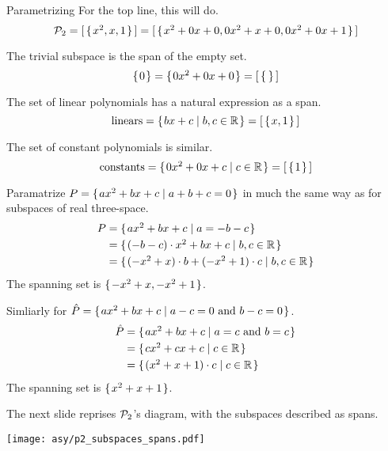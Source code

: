 \documentclass[10pt,t]{beamer}
\begin{document}
\begin{frame}{Parametrizing}
\ex
For the top line, this will do.
\begin{equation*}
  \mathcal{P}_2
  =\relax [\,\mbox{$\{\hspace{0.1em}x^2,x,1\hspace{0.1em}\}$}\,\relax ]
  =\relax [\,\mbox{$\{\hspace{0.1em}x^2+0x+0,
               0x^2+x+0,
               0x^2+0x+1\hspace{0.1em}\}$}\,\relax ]       
\end{equation*}

\ex
The trivial subspace is the span of the empty set.
\begin{equation*}
  \set{0}
  =\set{0x^2+0x+0}
  =\spanof{\,\set{}\,}
\end{equation*}

\pause
\ex
The set of linear polynomials has a natural expression as a span.
\begin{equation*}
  \text{linears}
  =\mbox{$\{\hspace{0.1em}bx+c\mid b,c\in\mathbb{R}\hspace{0.1em}\}$}
  =\relax [\,\mbox{$\{\hspace{0.1em}x,1\hspace{0.1em}\}$}\,\relax ]
\end{equation*}

\ex
The set of constant polynomials is similar.
\begin{equation*}
  \text{constants}
  =\mbox{$\{\hspace{0.1em}0x^2+0x+c\mid c\in\mathbb{R}\hspace{0.1em}\}$}
  =\relax [\,\mbox{$\{\hspace{0.1em}1\hspace{0.1em}\}$}\,\relax ]
\end{equation*}
\end{frame}


\begin{frame}
\ex
Paramatrize $P=\mbox{$\{\hspace{0.1em}ax^2+bx+c\mid a+b+c=0\hspace{0.1em}\}$}$ 
in much the same way as for subspaces of real three-space.
\begin{align*}
  P
  &=\mbox{$\{\hspace{0.1em}ax^2+bx+c\mid a=-b-c\hspace{0.1em}\}$}     \\
  &=\mbox{$\{\hspace{0.1em}(-b-c)\cdot x^2+bx+c\mid b,c\in\mathbb{R}\hspace{0.1em}\}$}  \\     
  &=\mbox{$\{\hspace{0.1em}(-x^2+x)\cdot b+(-x^2+1)\cdot c\mid b,c\in\mathbb{R}\hspace{0.1em}\}$}       
\end{align*}
The spanning set is $\mbox{$\{\hspace{0.1em}-x^2+x, -x^2+1\hspace{0.1em}\}$}$.

\pause
\ex
Simliarly for 
$\hat{P}=\mbox{$\{\hspace{0.1em}ax^2+bx+c\mid \text{$a-c=0$ and $b-c=0$}\hspace{0.1em}\}$}$.
\begin{align*}
  \hat{P}
  &=\mbox{$\{\hspace{0.1em}ax^2+bx+c\mid \text{$a=c$ and $b=c$}\hspace{0.1em}\}$}     \\
  &=\mbox{$\{\hspace{0.1em}cx^2+cx+c\mid c\in\mathbb{R}\hspace{0.1em}\}$}     \\
  &=\mbox{$\{\hspace{0.1em}(x^2+x+1)\cdot c \mid c\in\mathbb{R}\hspace{0.1em}\}$}       
\end{align*}
The spanning set is $\mbox{$\{\hspace{0.1em}x^2+x+1\hspace{0.1em}\}$}$.

\pause\medskip
The next slide reprises $\mathcal{P}_2$'s diagram,
with the subspaces described as spans.
\end{frame}
\begin{frame}
{\centering\texttt{[image: asy/p2\_subspaces\_spans.pdf]}}  
\end{frame}
\end{document}
